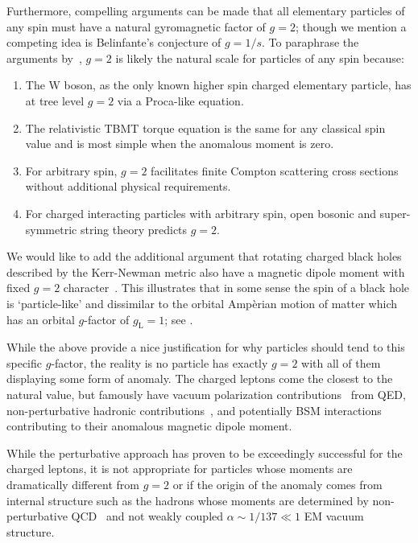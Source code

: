 Furthermore, compelling arguments can be made that all elementary particles of any spin must have a natural gyromagnetic factor of $g\!=\!2$; though we mention a competing idea is Belinfante's conjecture of $g\!=\!1/s$. To paraphrase the arguments by~\citet*{Ferrara:1992yc}, $g\!=\!2$ is likely the natural scale for particles of any spin because:
\begin{enumerate}[nosep]
	\item The W boson, as the only known higher spin charged elementary particle, has at tree level $g\!=\!2$ via a Proca-like equation.
	\item The relativistic TBMT torque equation is the same for any classical spin value and is most simple when the anomalous moment is zero.
	\item For arbitrary spin, $g\!=\!2$ facilitates finite Compton scattering cross sections without additional physical requirements.
	\item For charged interacting particles with arbitrary spin, open bosonic and super-symmetric string theory predicts $g\!=\!2$.
\end{enumerate}
We would like to add the additional argument that rotating charged black holes described by the Kerr-Newman metric also have a magnetic dipole moment with fixed $g\!=\!2$ character~\citep{Carter:1968rr}. This illustrates that in some sense the spin of a black hole is `particle-like' and dissimilar to the orbital Amp{\`e}rian motion of matter which has an orbital $g$-factor of $g_\mathrm{L}\!=\!1$; see .

While the above provide a nice justification for why particles should tend to this specific $g$-factor, the reality is no particle has exactly $g\!=\!2$ with all of them displaying some form of anomaly. The charged leptons come the closest to the natural value, but famously have vacuum polarization contributions~\citep{Schwinger:1951nm} from QED, non-perturbative hadronic contributions~\citep{Jegerlehner:2017gek}, and potentially BSM interactions~\citep{Knecht:2003kc} contributing to their anomalous magnetic dipole moment.

While the perturbative approach has proven to be exceedingly successful for the charged leptons, it is not appropriate for particles whose moments are dramatically different from $g\!=\!2$ or if the origin of the anomaly comes from internal structure such as the hadrons whose moments are determined by non-perturbative QCD~\citep{Pacetti:2014jai} and not weakly coupled $\alpha\sim1/137\ll1$ EM vacuum structure.

